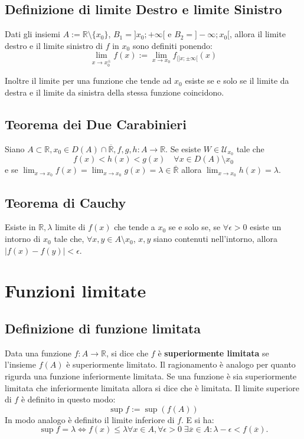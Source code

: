 \documentclass{article}
\begin{document}
\subsection{Definizione di limite Destro e limite Sinistro}
Dati gli insiemi $A:= \mathbb{R}\setminus \{x_0\}$, $B_1=]x_0;+ \infty[$ e $B_2=]- \infty;x_0[$, allora il limite destro e il limite sinistro di $f$ in $x_0$ sono definiti ponendo:
\begin{equation*}
    \lim_{x \to x^\pm_0} f(x):=\lim_{x \to x_0}f_{|]x;\pm \infty[}(x)
\end{equation*}

Inoltre il limite per una funzione che tende ad $x_0$ esiste se e solo se il limite da destra e il limite da sinistra della stessa funzione coincidono.

\subsection{Teorema dei Due Carabinieri}
Siano $A \subset \mathbb{R}, x_0 \in D(A) \cap \overline{\mathbb{R}}, f,g,h: A\rightarrow \mathbb{R}$. Se esiste $W \in \mathcal{U}_{x_0}$ tale che
\begin{equation*}
    f(x)<h(x)<g(x) \quad \forall x \in D(A) \setminus {x_0}
\end{equation*}
e se $\lim_{x \to x_0}f(x)=\lim_{x \to x_0}g(x)=\lambda \in \overline{\mathbb{R}}$ allora $\lim_{x \to x_0}h(x)=\lambda$.

\subsection{\textbf{Teorema di Cauchy}}
Esiste in $\mathbb{R}, \lambda$ limite di $f(x)$ che tende a $x_0$ se e solo se, se $\forall \epsilon>0$ esiste un intorno di $x_0$ tale che, $\forall x,y\in A\setminus {x_0}$, $x,y$ siano contenuti nell'intorno, allora $|f(x)-f(y)|<\epsilon$.

\section{Funzioni limitate}
\subsection{Definizione di funzione limitata}
Data una funzione $f:A\rightarrow \mathbb{R}$, si dice che $f$ è \textbf{superiormente limitata} se l'insieme $f(A)$ è superiormente limitato. Il ragionamento è analogo per quanto rigurda una funzione inferiormente limitata. Se una funzione è sia superiormente limitata che inferiormente limitata allora si dice che è limitata.
Il limite superiore di $f$ è definito in questo modo:
\begin{equation*}
    \sup f:=\sup(f(A))
\end{equation*}
In modo analogo è definito il limite inferiore di $f$. E si ha:
\begin{equation*}
    \sup f=\lambda \iff f(x) \leq \lambda \forall x \in A, \forall \epsilon >0 \; \exists \overline{x}\in A: \lambda - \epsilon<f(\overline{x}).
\end{equation*}
\end{document}
